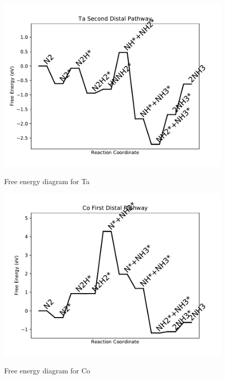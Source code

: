 \documentclass[journal=jacsat,manuscript=article]{achemso}
\begin{document}
\begin{figure}
\includegraphics[width=1\linewidth]{data/plots/Ta_distal_2.pdf}
\label{fig:Ta_distal_2}
\caption{Free energy diagram for Ta}
\end{figure}

\newpage
\begin{figure}
\includegraphics[width=1\linewidth]{data/plots/Co_distal_1.pdf}
\label{fig:Co_distal_1}
\caption{Free energy diagram for Co}
\end{figure}
\end{document}
